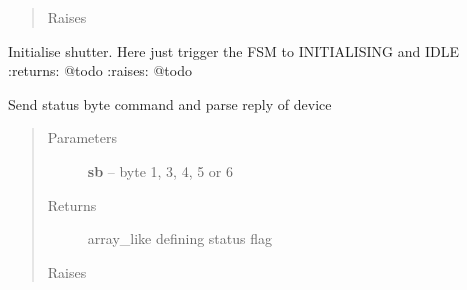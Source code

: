 \documentclass[letterpaper,10pt,english]{sphinxmanual}
\begin{document}
\begin{fulllineitems}
\begin{fulllineitems}
\begin{quote}
\begin{description}
\item[{Raises}] \leavevmode
{\hyperref[enuActor.Devices:enuActor.Devices.Error.CommErr]{}}

\end{description}\end{quote}

\end{fulllineitems}


\begin{fulllineitems}
\label{enuActor.Devices:enuActor.Devices.shutter.Shutter.initialise}
Initialise shutter.
Here just trigger the FSM to INITIALISING and IDLE
:returns: @todo
:raises: @todo

\end{fulllineitems}


\begin{fulllineitems}
\label{enuActor.Devices:enuActor.Devices.shutter.Shutter.parseStatusByte}
Send status byte command and parse reply of device
\begin{quote}\begin{description}
\item[{Parameters}] \leavevmode
\textbf{sb} -- byte 1, 3, 4, 5 or 6

\item[{Returns}] \leavevmode
array\_like defining status flag

\item[{Raises}] \leavevmode
{\hyperref[enuActor.Devices:enuActor.Devices.Error.CommErr]{}}

\end{description}\end{quote}

\end{fulllineitems}


\begin{fulllineitems}
\label{enuActor.Devices:enuActor.Devices.shutter.Shutter.positions}
\end{fulllineitems}


\end{fulllineitems}
\end{document}
